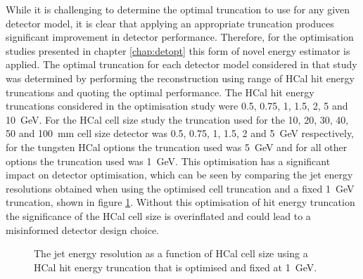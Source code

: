While it is challenging to determine the optimal truncation to use for any given detector model, it is clear that applying an appropriate truncation produces significant improvement in detector performance.  Therefore, for the optimisation studies presented in chapter \ref{chap:detopt} this form of novel energy estimator is applied.  The optimal truncation for each detector model considered in that study was determined by performing the reconstruction using range of HCal hit energy truncations and quoting the optimal performance.  The HCal hit energy truncations considered in the optimisation study were 0.5, 0.75, 1, 1.5, 2, 5 and 10~GeV.  For the HCal cell size study the truncation used for the 10, 20, 30, 40, 50 and 100~mm cell size detector was 0.5, 0.75, 1, 1.5, 2 and 5~GeV respectively, for the tungsten HCal options the truncation used was 5~GeV and for all other options the truncation used was 1~GeV.  This optimisation has a significant impact on detector optimisation, which can be seen by comparing the jet energy resolutions obtained when using the optimised cell truncation and a fixed 1~GeV truncation, shown in figure \ref{fig:jerhcalcellopt}.  Without this optimisation of hit energy truncation the significance of the HCal cell size is overinflated and could lead to a misinformed detector design choice.  

\begin{figure}[h!]
\caption[The jet energy resolution as a function of HCal cell size using a HCal hit energy truncation that is \protect{} optimised and \protect{} fixed at 1~GeV.]{The jet energy resolution as a function of HCal cell size using a HCal hit energy truncation that is \protect{} optimised and \protect{} fixed at 1~GeV.}
\label{fig:jerhcalcellopt}
\end{figure}

